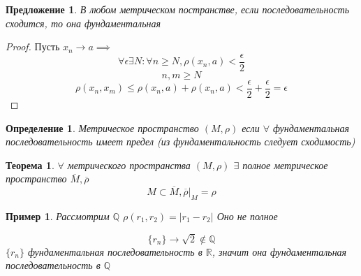 \documentclass[14pt]{extarticle}
\newtheorem{theorem}{Теорема}
\newtheorem{definition}{Определение}
\newtheorem{pred}{Предложение}[section]
\newtheorem{example}{Пример}[definition]
\newcommand{\bm}[1]{ \left.#1\right|}
\begin{document}
\begin{pred}
	В любом метрическом постранстве, если
	последовательность сходится, то она фундаментальная
\end{pred}
\begin{proof}
	Пусть $x_{n} \to a \implies$
	 \begin{equation}
	 \forall  \epsilon \exists  N: \forall n \ge  N, 
	 \rho(x_{n},a) < \frac{\epsilon}{2}
	 \end{equation} 
	 \begin{equation}
	 n,m \ge  N 
	 \end{equation} 
	 \begin{equation}
	 \rho(x_{n},x_{m}) \le \rho(x_{n},a) + \rho(x_{n},a) <
	 \frac{\epsilon}{2} + \frac{\epsilon}{2}  = \epsilon
	 \end{equation} 
\end{proof}
\begin{definition}
	Метрическое пространство $(M,\rho)$ 
	если  $\forall $ фундаментальная последовательность
	имеет предел 
	(из фундаментальность  следует сходимость)
\end{definition}
\begin{theorem}
$\forall $ метрического пространства
$(M,\rho)$  $\exists $ полное метрическое пространство
$\overline{M},\overline{\rho}$
 \begin{equation}
	 M \subset \overline{M},\bm{\overline{\rho}}_{M} = \rho
 \end{equation} 
\end{theorem}
\begin{example}
	Рассмотрим $\mathbb{Q}$  $\rho(r_1,r_2) = |r_1 - r_2|$
	Оно не полное

	\begin{equation}
		\{r_{n }\} \to \sqrt{2} \notin  \mathbb{Q}
	\end{equation} 
	$\{r_{n}\}$ фундаментальная последовательность в  $\mathbb{R}$, значит она фундаментальная последовательность в $\mathbb{Q}$
\end{example}
\end{document}
